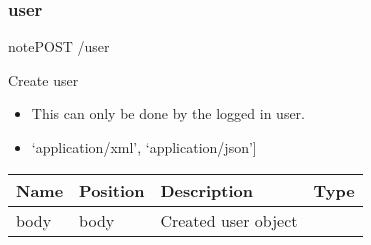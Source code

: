 \documentclass[letterpaper,10pt,english]{sphinxmanual}
\begin{document}
\subsubsection{user}
\label{\detokenize{dev-guide:user}}
\begin{sphinxadmonition}{note}{POST /user}

Create user\begin{itemize}
\item {} 
This can only be done by the logged in user.

\item {} 
\sphinxstylestrong{Produces: 
}{[}‘application/xml’, ‘application/json’{]}

\end{itemize}




\begin{savenotes}\sphinxattablestart
\centering
\begin{tabulary}{\linewidth}[t]{|T|T|T|T|}
\hline
\sphinxstyletheadfamily 
Name
&\sphinxstyletheadfamily 
Position
&\sphinxstyletheadfamily 
Description
&\sphinxstyletheadfamily 
Type
\\
\hline
body
&
body
&
Created user object
&

\\
\hline
\end{tabulary}
\par
\sphinxattableend\end{savenotes}


\end{sphinxadmonition}
\end{document}
